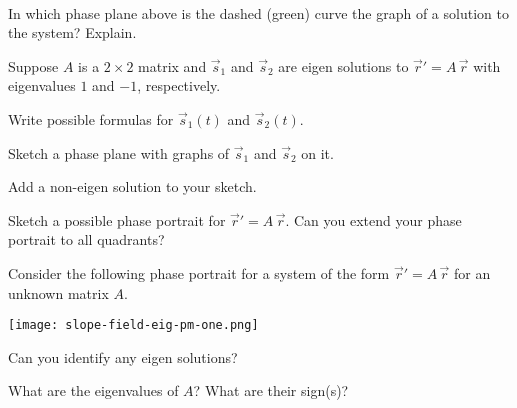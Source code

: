 \documentclass{workbook}
\begin{document}
\begin{slide}
\begin{parts}
\begin{minipage}[t]{.45\textwidth}
\begin{center}
\\
			\end{center}
		\end{minipage}
			In which phase plane above is the dashed (green) curve the graph of a solution to the system? Explain.


	\end{parts}
\end{slide}

\begin{slide}
	\question
		Suppose $A$ is a $2\times 2$ matrix and $\vec s_1$ and $\vec s_2$ are eigen solutions to $\vec r'=A\,\vec r$ with eigenvalues $1$ and $-1$, respectively.
	\begin{parts}
		\item Write possible formulas for $\vec s_1(t)$ and $\vec s_2(t)$.
		\item Sketch a phase plane with graphs of $\vec s_1$ and $\vec s_2$ on it.
		\item Add a non-eigen solution to your sketch.
		\item Sketch a possible phase portrait for $\vec r'=A\,\vec r$. Can you extend your phase portrait to all quadrants?
	\end{parts}
\end{slide}

\begin{slide}
	\question
		Consider the following phase portrait for a system of the form $\vec r'=A\,\vec r$
		for an unknown matrix $A$.

		\begin{center}
		\texttt{[image: slope-field-eig-pm-one.png]}
		\end{center}
	\begin{parts}
		\item Can you identify any eigen solutions?
		\item What are the eigenvalues of $A$? What are their sign(s)?
	\end{parts}
\end{slide}
\end{document}
